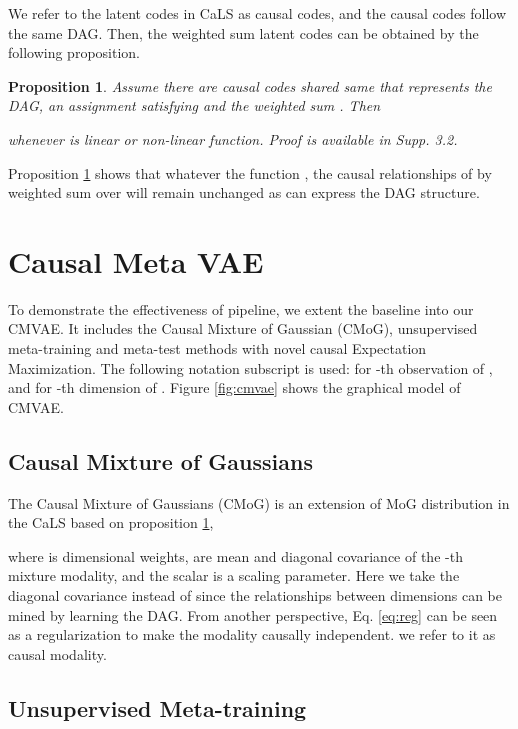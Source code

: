 \documentclass[letterpaper]{article} \usepackage{aaai23}  \usepackage{times}  \usepackage{helvet}  \usepackage{courier}  \usepackage[hyphens]{url}  \usepackage{graphicx} \urlstyle{rm} \def\UrlFont{\rm}  \usepackage{natbib}  \usepackage{caption} \frenchspacing  \setlength{\pdfpagewidth}{8.5in}  \setlength{\pdfpageheight}{11in}  \usepackage{algorithm}
\theoremstyle{plain}
\newtheorem{proposition}[theorem]{Proposition}
\theoremstyle{definition}
\theoremstyle{remark}
\begin{document}
We refer to the latent codes in CaLS as causal codes, and the causal codes follow the same DAG. 
Then, the weighted sum latent codes can be obtained by the following proposition.
\begin{proposition} 
	\label{sec:prop1}
	Assume there are  causal codes  shared same  that represents the DAG, an assignment  satisfying  and the weighted sum . Then  
	
	whenever  is linear or non-linear function. 
	Proof is available in Supp. 3.2. 	  
\end{proposition} 
Proposition \ref{sec:prop1} shows that whatever the function , the causal relationships of  by weighted sum over  will remain unchanged  as  can express the DAG structure.

\section{Causal Meta VAE}




To demonstrate the effectiveness of pipeline, we extent the baseline \cite{lee2021metagmvae} into our CMVAE. It includes the Causal Mixture of Gaussian (CMoG), unsupervised meta-training and meta-test methods with novel causal Expectation Maximization. The following notation subscript is used:  for -th observation of , and  for -th dimension of . Figure \ref{fig:cmvae} shows the graphical model of CMVAE.	


\subsection{Causal Mixture of Gaussians} 
The Causal Mixture of Gaussians (CMoG) is an extension of MoG distribution in the CaLS  based on proposition \ref{sec:prop1},

where  is  dimensional weights,  are mean and diagonal covariance of the -th mixture modality, and the scalar   is a scaling parameter. Here we take the diagonal covariance  instead of  since the relationships between dimensions can be mined by learning the DAG. From another perspective, Eq. \ref{eq:reg} can be seen as a regularization to make the modality causally independent. we refer to it as {causal modality}.




\subsection{Unsupervised Meta-training} 
\end{document}
